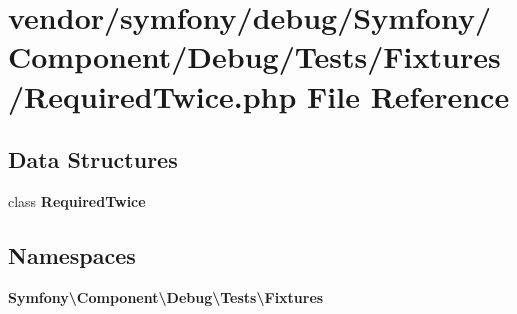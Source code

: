 \section{vendor/symfony/debug/\+Symfony/\+Component/\+Debug/\+Tests/\+Fixtures/\+Required\+Twice.php File Reference}
\label{_required_twice_8php}
\subsection*{Data Structures}
\begin{DoxyCompactItemize}
\item 
class {\bf Required\+Twice}
\end{DoxyCompactItemize}
\subsection*{Namespaces}
\begin{DoxyCompactItemize}
\item 
 {\bf Symfony\textbackslash{}\+Component\textbackslash{}\+Debug\textbackslash{}\+Tests\textbackslash{}\+Fixtures}
\end{DoxyCompactItemize}
